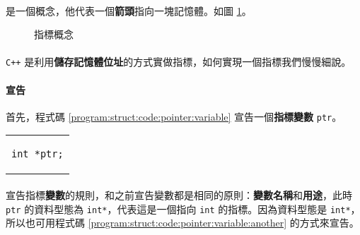 \documentclass[12pt,a4paper,oneside]{article}
\begin{document}
\begin{CJK}{UTF8}{bkai}
\paragraph{}是一個概念，他代表一個{\color{blue}\textbf{箭頭}}指向一塊記憶體。如圖 \ref{program:struct:fig:pointer}。

\begin{figure}[h!]
\centering
{}
\caption{指標概念}
\label{program:struct:fig:pointer}
\end{figure}

\paragraph{}\texttt{C++} 是利用{\color{red}\textbf{儲存記憶體位址}}的方式實做指標，如何實現一個指標我們慢慢細說。
\paragraph{宣告}首先，程式碼 \ref{program:struct:code:pointer:variable} 宣告一個\textbf{指標變數} \lstinline!ptr!。

\begin{code}[h!]
\centering
\begin{tabular}{c}
\begin{lstlisting}
int *ptr;
\end{lstlisting}
\end{tabular}
\caption{宣告指標變數 \lstinline!ptr!}
\label{program:struct:code:pointer:variable}
\end{code}

\paragraph{}宣告指標\textbf{變數}的規則，和之前宣告變數都是相同的原則：\textbf{變數名稱}和\textbf{用途}，此時 \lstinline!ptr! 的資料型態為 \lstinline!int*!，代表這是一個指向 \lstinline!int! 的指標。因為資料型態是 \lstinline!int*!，所以也可用程式碼 \ref{program:struct:code:pointer:variable:another} 的方式來宣告。


\end{CJK}
\end{document}
